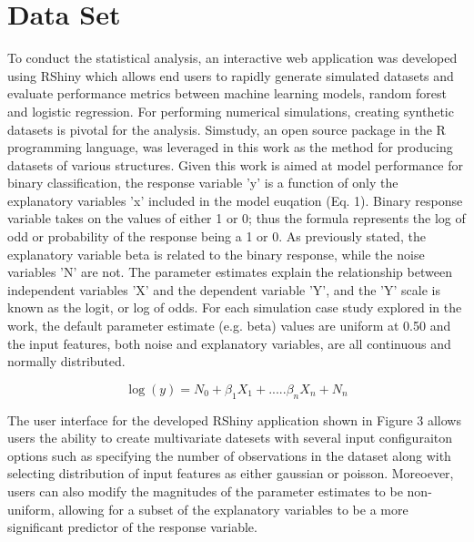 \documentclass{llncs}
\begin{document}
\section{Data Set}

To conduct the statistical analysis, an interactive web application was developed using RShiny which allows end users to rapidly generate simulated datasets and evaluate performance metrics between machine learning models, random forest and logistic regression. For performing numerical simulations, creating synthetic datasets is pivotal for the analysis. Simstudy, an open source package in the R programming language, was leveraged in this work as the method for producing datasets of various structures. Given this work is aimed at model performance for binary classification, the response variable 'y' is a function of only the explanatory variables 'x' included in the model euqation (Eq. 1). Binary response variable takes on the values of either 1 or 0; thus the formula represents the log of odd or probability of the response being a 1 or 0. As previously stated, the explanatory variable beta is related to the binary response, while the noise variables 'N' are not. The parameter estimates explain the relationship between independent variables 'X' and the dependent variable 'Y', and the 'Y' scale is known as the logit, or log of odds. For each simulation case study explored in the work, the default parameter estimate (e.g. beta) values are uniform at 0.50 and the input features, both noise and explanatory variables, are all continuous and normally distributed. 

\begin{equation}
\log(y) = N_{0} + \beta_{1}X_{1} + .....\beta_{n}X_{n} + N_{n} 
\end{equation}

The user interface for the developed RShiny application shown in Figure 3 allows users the ability to create multivariate datesets with several input configuraiton options such as specifying the number of observations in the dataset along with selecting distribution of input features as either gaussian or poisson. Moreoever, users can also modify the magnitudes of the parameter estimates to be non-uniform, allowing for a subset of the explanatory variables to be a more significant predictor of the response variable. 
\end{document}
